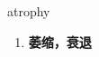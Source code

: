
\begin{frame}
{\huge atrophy}
\begin{center}
\begin{enumerate}\Large
  \item \textbf{萎缩，衰退}
\end{enumerate}
\end{center}
\end{frame}
